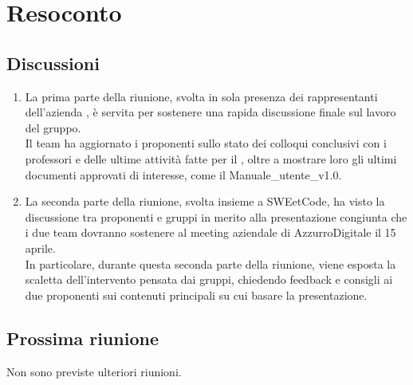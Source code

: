 \section{Resoconto} \label{sec:resoconto}
\subsection{Discussioni} \label{subsec:resdiscussione}
\begin{enumerate}
    \item La prima parte della riunione, svolta in sola presenza dei rappresentanti dell'azienda , è servita per sostenere una rapida discussione finale sul lavoro del gruppo.\\
    Il team ha aggiornato i proponenti sullo stato dei colloqui conclusivi con i professori e delle ultime attività fatte per il , oltre a mostrare loro gli ultimi documenti approvati di interesse, come il Manuale\_utente\_v1.0.
    \item La seconda parte della riunione, svolta insieme a SWEetCode, ha visto la discussione tra proponenti e gruppi in merito alla presentazione congiunta che i due team dovranno sostenere al meeting aziendale di AzzurroDigitale il 15 aprile.\\
    In particolare, durante questa seconda parte della riunione, viene esposta la scaletta dell'intervento pensata dai gruppi, chiedendo feedback e consigli ai due proponenti sui contenuti principali su cui basare la presentazione.
\end{enumerate}
\subsection{Prossima riunione} \label{subsec:riunione}
Non sono previste ulteriori riunioni.


